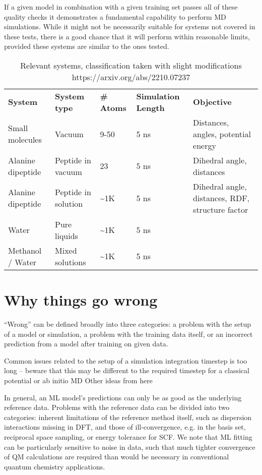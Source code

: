 \documentclass[9pt,bestpractices]{livecoms}
\begin{document}
If a given model in combination with a given training set passes all of these
quality checks it demonstrates a fundamental capability to perform MD
simulations. While it might not be necessarily suitable for systems not covered
in these tests, there is a good chance that it will perform within reasonable
limits, provided these systems are similar to the ones tested.


\begin{table*}
    \centering
    \begin{tabular}{l|l|l|l|l}
         \textbf{System} & \textbf{System type} & \textbf{\# Atoms} & \textbf{Simulation Length} & \textbf{Objective}\\
Small molecules &    Vacuum &9-50 &5 ns&Distances, angles, potential energy\\
Alanine dipeptide &Peptide in vacuum&23 &5 ns&Dihedral angle, distances\\
Alanine dipeptide &Peptide in solution& \textasciitilde  1K&5 ns&Dihedral angle, distances, RDF, structure factor\\
Water &Pure liquids& \textasciitilde 1K&5 ns&\\
Methanol / Water &Mixed solutions&\textasciitilde 1K&5 ns&\\         
    \end{tabular}
    \caption{Relevant systems, classification taken with slight modifications https://arxiv.org/abs/2210.07237}
    \label{tab:system_types}
\end{table*}

\section{Why things go wrong}
“Wrong” can be defined broadly into three categories: a problem with the setup
of a model or simulation, a problem with the training data itself, or an
incorrect prediction from a model after training on given data.

Common issues related to the setup of a simulation integration timestep is too
long -- beware that this may be different to the required timestep for a
classical potential or ab initio MD Other ideas from here

In general, an ML model’s predictions can only be as good as the underlying
reference data. Problems with the reference data can be divided into two
categories: inherent limitations of the reference method itself, such as
dispersion interactions missing in DFT, and those of ill-convergence, e.g. in
the basis set, reciprocal space sampling, or energy tolerance for SCF. We note
that ML fitting can be particularly sensitive to noise in data, such that much
tighter convergence of QM calculations are required than would be necessary in
conventional quantum chemistry applications.
\end{document}

